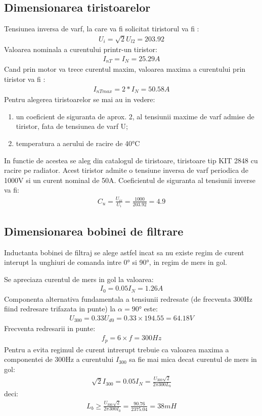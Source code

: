 \documentclass[11pt]{article}
\begin{document}
\subsection{Dimensionarea tiristoarelor}
Tensiunea inversa de varf, la care va fi solicitat tiristorul va fi :
\begin{align*}
U_i=\sqrt{2}U_{l2}=203.92
\end{align*}
Valoarea nominala a curentului printr-un tiristor:
\begin{align*}
I_{nT}=I_N=25.29A
\end{align*}
Cand prin motor va trece curentul maxim, valoarea maxima a curentului prin tiristor va fi :
\begin{align*}
I_{nTmax}=2*I_N=50.58A
\end{align*}
Pentru alegerea tiristoarelor se mai au in vedere:
\begin{enumerate}[label=$\bullet$]
	\item un coeficient de siguranta de aprox. 2, al tensiunii maxime de varf admise de tiristor, fata de tensiunea de varf U;
	\item temperatura a aerului de racire de \ang{40}C
\end{enumerate}
In functie de acestea se aleg din catalogul de tiristoare, tiristoare tip KIT 2848 cu racire pe radiator. Acest tiristor admite o tensiune inversa de varf periodica de 1000V si un curent nominal de 50A.
Coeficientul de siguranta al tensiunii inverse va fi:
\begin{align*}
C_u=\frac{U_{iv}}{U_i}=\frac{1000}{203.92}=4.9
\end{align*}
\subsection{Dimensionarea bobinei de filtrare}
Inductanta bobinei de filtraj se alege astfel incat sa nu existe regim de curent interupt la unghiuri de comanda intre \ang{0} si \ang{90}, in regim de mers in gol.

Se apreciaza curentul de mers in gol la valoarea:
\begin{align*}
I_0=0.05I_N=1.26A
\end{align*}
Componenta alternativa fundamentala a tensiunii redresate (de frecventa 300Hz fiind redresare trifazata in punte) la $\alpha=\ang{90}$ este:
\begin{align*}
U_{300}=0.33U_{d0}=0.33\times 194.55=64.18V
\end{align*}
Frecventa redresarii in punte:
\begin{align*}
f_p=6\times f=300Hz
\end{align*}
Pentru a evita regimul de curent intrerupt trebuie ca valoarea maxima a componentei de 300Hz a curentului $I_{300}$ sa fie mai mica decat curentul de mers in gol:
\begin{align*}
\sqrt{2}I_{300}=0.05I_N=\frac{U_{300}\sqrt{2}}{2\pi300L_b}
\end{align*}
deci:
\begin{align*}
L_b\geq\frac{U_{300}\sqrt{2}}{2\pi300I_0}=\frac{90.76}{2375.04}=38mH
\end{align*}
\end{document}
